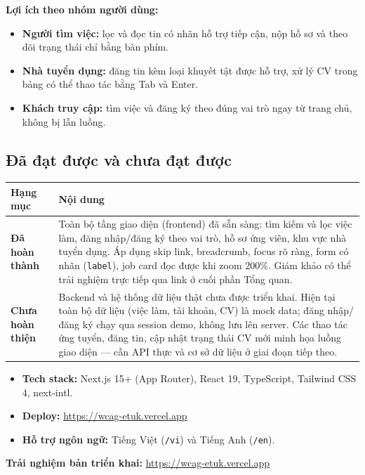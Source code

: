 \documentclass[12pt,a4paper]{article}
\begin{document}
\textbf{Lợi ích theo nhóm người dùng:}
\begin{itemize}
  \item \textbf{Người tìm việc:} lọc và đọc tin có nhãn hỗ trợ tiếp cận, nộp hồ sơ và theo dõi trạng thái chỉ bằng bàn phím.
  \item \textbf{Nhà tuyển dụng:} đăng tin kèm loại khuyết tật được hỗ trợ, xử lý CV trong bảng có thể thao tác bằng Tab và Enter.
  \item \textbf{Khách truy cập:} tìm việc và đăng ký theo đúng vai trò ngay từ trang chủ, không bị lẫn luồng.
\end{itemize}

\subsection{Đã đạt được và chưa đạt được}

\begin{longtable}{>{\bfseries}p{4.0cm}p{10.6cm}}
\toprule
Hạng mục & Nội dung \\
\midrule
\endhead
Đã hoàn thành &
Toàn bộ tầng giao diện (frontend) đã sẵn sàng: tìm kiếm và lọc việc làm,
đăng nhập/đăng ký theo vai trò, hồ sơ ứng viên, khu vực nhà tuyển dụng.
Áp dụng skip link, breadcrumb, focus rõ ràng, form có nhãn (\texttt{label}),
job card đọc được khi zoom 200\%. Giám khảo có thể trải nghiệm trực tiếp
qua link ở cuối phần Tổng quan. \\
\midrule
Chưa hoàn thiện &
Backend và hệ thống dữ liệu thật chưa được triển khai.
Hiện tại toàn bộ dữ liệu (việc làm, tài khoản, CV) là mock data;
đăng nhập/đăng ký chạy qua session demo, không lưu lên server.
Các thao tác ứng tuyển, đăng tin, cập nhật trạng thái CV mới minh họa
luồng giao diện — cần API thực và cơ sở dữ liệu ở giai đoạn tiếp theo. \\
\bottomrule
\end{longtable}

\begin{itemize}
  \item \textbf{Tech stack:} Next.js 15+ (App Router), React 19, TypeScript, Tailwind CSS 4, next-intl.
  \item \textbf{Deploy:} \url{https://wcag-etuk.vercel.app}
  \item \textbf{Hỗ trợ ngôn ngữ:} Tiếng Việt (\texttt{/vi}) và Tiếng Anh (\texttt{/en}).
\end{itemize}

\medskip
\noindent\textbf{Trải nghiệm bản triển khai:} \url{https://wcag-etuk.vercel.app}
\end{document}
